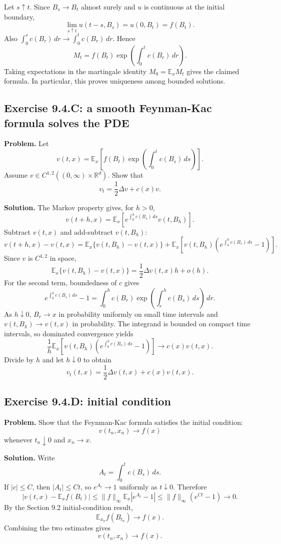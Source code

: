 \documentclass[11pt]{article}
\newcommand{\R}{\mathbb{R}}
\newcommand{\E}{\mathbb{E}}
\newcommand{\dd}{\,d}
\newcommand{\Del}{\Delta}
\begin{document}
Let $s\uparrow t$.  Since $B_s\to B_t$ almost surely and $u$ is
continuous at the initial boundary,
\[
  \lim_{s\uparrow t}u(t-s,B_s)=u(0,B_t)=f(B_t).
\]
Also $\int_0^s c(B_r)\dd r\to\int_0^t c(B_r)\dd r$.  Hence
\[
  M_t
  =
  f(B_t)\exp\left(\int_0^t c(B_r)\dd r\right).
\]
Taking expectations in the martingale identity $M_0=\E_xM_t$ gives the
claimed formula.  In particular, this proves uniqueness among bounded
solutions.

\subsection*{Exercise 9.4.C: a smooth Feynman-Kac formula solves the PDE}

\noindent\textbf{Problem.}
Let
\[
  v(t,x)=
  \E_x\left[
    f(B_t)\exp\left(\int_0^t c(B_s)\dd s\right)
  \right].
\]
Assume $v\in C^{1,2}((0,\infty)\times\R^d)$.  Show that
\[
  v_t=\frac12\Del v+c(x)v.
\]

\noindent\textbf{Solution.}
The Markov property gives, for $h>0$,
\[
  v(t+h,x)
  =
  \E_x\left[
    e^{\int_0^h c(B_s)\dd s}v(t,B_h)
  \right].
\]
Subtract $v(t,x)$ and add-subtract $v(t,B_h)$:
\[
  v(t+h,x)-v(t,x)
  =
  \E_x\{v(t,B_h)-v(t,x)\}
  +
  \E_x\left[
    v(t,B_h)\left(e^{\int_0^h c(B_s)\dd s}-1\right)
  \right].
\]
Since $v$ is $C^{1,2}$ in space,
\[
  \E_x\{v(t,B_h)-v(t,x)\}
  =
  \frac12\Del v(t,x)h+o(h).
\]
For the second term, boundedness of $c$ gives
\[
  e^{\int_0^h c(B_s)\dd s}-1
  =
  \int_0^h c(B_r)\exp\left(\int_r^h c(B_s)\dd s\right)\dd r.
\]
As $h\downarrow0$, $B_r\to x$ in probability uniformly on small time
intervals and $v(t,B_h)\to v(t,x)$ in probability.  The integrand is
bounded on compact time intervals, so dominated convergence yields
\[
  \frac1h
  \E_x\left[
    v(t,B_h)\left(e^{\int_0^h c(B_s)\dd s}-1\right)
  \right]
  \to c(x)v(t,x).
\]
Divide by $h$ and let $h\downarrow0$ to obtain
\[
  v_t(t,x)=\frac12\Del v(t,x)+c(x)v(t,x).
\]

\subsection*{Exercise 9.4.D: initial condition}

\noindent\textbf{Problem.}
Show that the Feynman-Kac formula satisfies the initial condition:
\[
  v(t_n,x_n)\to f(x)
\]
whenever $t_n\downarrow0$ and $x_n\to x$.

\noindent\textbf{Solution.}
Write
\[
  A_t=\int_0^t c(B_s)\dd s.
\]
If $|c|\le C$, then $|A_t|\le Ct$, so $e^{A_t}\to1$ uniformly as
$t\downarrow0$.  Therefore
\[
  |v(t,x)-\E_xf(B_t)|
  \le
  \|f\|_\infty \E_x|e^{A_t}-1|
  \le
  \|f\|_\infty(e^{Ct}-1)\to0.
\]
By the Section 9.2 initial-condition result,
\[
  \E_{x_n}f(B_{t_n})\to f(x).
\]
Combining the two estimates gives
\[
  v(t_n,x_n)\to f(x).
\]
\end{document}
